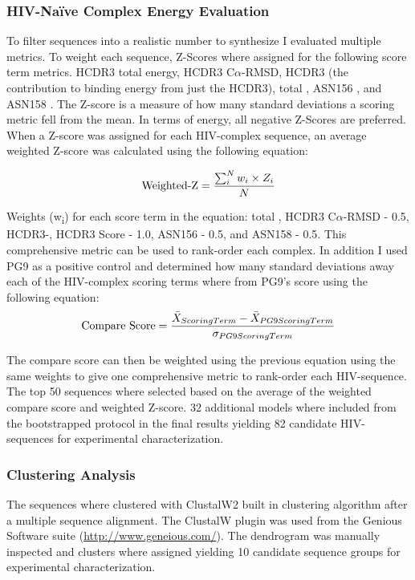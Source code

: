 \subsubsection{HIV-Na\"{i}ve Complex Energy Evaluation}
To filter \naive sequences into a realistic number to synthesize I evaluated multiple metrics. To weight each sequence, Z-Scores where assigned for the following score term metrics. HCDR3 total energy, HCDR3 C$\alpha$-RMSD, HCDR3 \ddg (the contribution to binding energy from just the HCDR3), total \ddg, ASN156 \ddg, and ASN158 \ddg. The Z-score is a measure of how many standard deviations a scoring metric fell from the mean. In terms of energy, all negative Z-Scores are preferred. When a Z-score was assigned for each HIV-\naive complex sequence, an average weighted Z-score was calculated using the following equation:

\begin{gather*}
\textup{Weighted-Z} = \frac{\sum_{i}^{N}w_{i}\times Z_{i}}{N}
\end{gather*}

Weights (w\textsubscript{i}) for each score term in the equation: total , HCDR3 C$\alpha$-RMSD - 0.5, HCDR3-, HCDR3 Score - 1.0, ASN156 \ddg - 0.5, and ASN158 \ddg - 0.5. This comprehensive metric can be used to rank-order each complex. In addition I used PG9 as a positive control and determined how many standard deviations away each of the HIV-\naive complex scoring terms where from PG9's score using the following equation:
\begin{gather*}
\textup{Compare Score} = \frac{\bar{X}_{Scoring Term}-\bar{X}_{PG9 Scoring Term}}{\sigma_{PG9 Scoring Term}}
\end{gather*}

The compare score can then be weighted using the previous equation using the same weights to give one comprehensive metric to rank-order each HIV-\naive sequence. The top 50 sequences where selected based on the average of the weighted compare score and weighted Z-score. 32 additional models where included from the bootstrapped protocol in the final results yielding 82 candidate HIV-\naive sequences for experimental characterization.

\subsubsection{Clustering Analysis}
The sequences where clustered with ClustalW2 built in clustering algorithm after a multiple sequence alignment. The ClustalW plugin was used from the Genious Software suite (\url{http://www.geneious.com/}). The dendrogram was manually inspected and clusters where assigned yielding 10 candidate sequence groups for experimental characterization.


